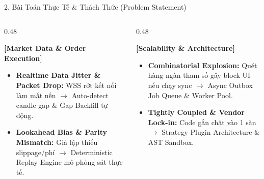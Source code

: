 \documentclass[aspectratio=169,10pt]{beamer}
\begin{document}
\begin{frame}{2. Bài Toán Thực Tế \& Thách Thức (Problem Statement)}
\begin{columns}[T]
\begin{column}{0.48\textwidth}
\begin{block}{\textbf{[Market Data \& Order Execution]}}
\begin{itemize}
  \item \textbf{Realtime Data Jitter \& Packet Drop:} WSS rớt kết nối làm mất nến $\rightarrow$ Auto-detect candle gap \& Gap Backfill tự động.
  \item \textbf{Lookahead Bias \& Parity Mismatch:} Giả lập thiếu slippage/phí $\rightarrow$ Deterministic Replay Engine mô phỏng sát thực tế.
\end{itemize}
\end{block}
\end{column}
\begin{column}{0.48\textwidth}
\begin{block}{\textbf{[Scalability \& Architecture]}}
\begin{itemize}
  \item \textbf{Combinatorial Explosion:} Quét hàng ngàn tham số gây block UI nếu chạy sync $\rightarrow$ Async Outbox Job Queue \& Worker Pool.
  \item \textbf{Tightly Coupled \& Vendor Lock-in:} Code gắn chặt vào 1 sàn $\rightarrow$ Strategy Plugin Architecture \& AST Sandbox.
\end{itemize}
\end{block}
\end{column}
\end{columns}
\end{frame}
\end{document}
